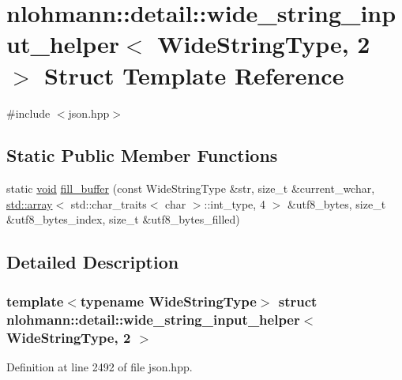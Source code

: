 \hypertarget{structnlohmann_1_1detail_1_1wide__string__input__helper_3_01_wide_string_type_00_012_01_4}{}\section{nlohmann\+::detail\+::wide\+\_\+string\+\_\+input\+\_\+helper$<$ Wide\+String\+Type, 2 $>$ Struct Template Reference}
\label{structnlohmann_1_1detail_1_1wide__string__input__helper_3_01_wide_string_type_00_012_01_4}


{\ttfamily \#include $<$json.\+hpp$>$}

\subsection*{Static Public Member Functions}
\begin{DoxyCompactItemize}
\item 
static \mbox{\hyperlink{namespacenlohmann_1_1detail_a59fca69799f6b9e366710cb9043aa77d}{void}} \mbox{\hyperlink{structnlohmann_1_1detail_1_1wide__string__input__helper_3_01_wide_string_type_00_012_01_4_a7ede7749f186f1a6a46c08abb607fd5c}{fill\+\_\+buffer}} (const Wide\+String\+Type \&str, size\+\_\+t \&current\+\_\+wchar, \mbox{\hyperlink{namespacenlohmann_1_1detail_a1ed8fc6239da25abcaf681d30ace4985af1f713c9e000f5d3f280adbd124df4f5}{std\+::array}}$<$ std\+::char\+\_\+traits$<$ char $>$\+::int\+\_\+type, 4 $>$ \&utf8\+\_\+bytes, size\+\_\+t \&utf8\+\_\+bytes\+\_\+index, size\+\_\+t \&utf8\+\_\+bytes\+\_\+filled)
\end{DoxyCompactItemize}


\subsection{Detailed Description}
\subsubsection*{template$<$typename Wide\+String\+Type$>$\newline
struct nlohmann\+::detail\+::wide\+\_\+string\+\_\+input\+\_\+helper$<$ Wide\+String\+Type, 2 $>$}



Definition at line 2492 of file json.\+hpp.




